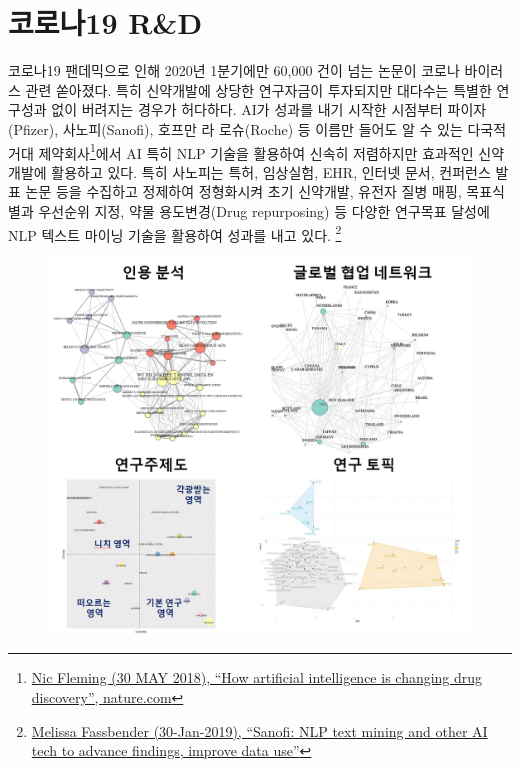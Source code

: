 \documentclass[smallextended]{svjour3}       %
\begin{document}
\hypertarget{covid-rnd}{%
\section{코로나19 R\&D}\label{covid-rnd}}

코로나19 팬데믹으로 인해 2020년 1분기에만 60,000 건이 넘는 논문이 코로나
바이러스 관련 쏟아졌다. 특히 신약개발에 상당한 연구자금이 투자되지만
대다수는 특별한 연구성과 없이 버려지는 경우가 허다하다. AI가 성과를 내기
시작한 시점부터 파이자(Pfizer), 사노피(Sanofi), 호프만 라 로슈(Roche) 등
이름만 들어도 알 수 있는 다국적 거대 제약회사\footnote{\href{https://www.nature.com/articles/d41586-018-05267-x}{Nic
  Fleming (30 MAY 2018), ``How artificial intelligence is changing drug
  discovery'', nature.com}}에서 AI 특히 NLP 기술을 활용하여 신속히
저렴하지만 효과적인 신약개발에 활용하고 있다. 특히 사노피는 특허,
임상실험, EHR, 인터넷 문서, 컨퍼런스 발표 논문 등을 수집하고 정제하여
정형화시켜 초기 신약개발, 유전자 질병 매핑, 목표식별과 우선순위 지정,
약물 용도변경(Drug repurposing) 등 다양한 연구목표 달성에 NLP 텍스트
마이닝 기술을 활용하여 성과를 내고 있다. \footnote{\href{https://www.outsourcing-pharma.com/Article/2019/01/30/Sanofi-NLP-text-mining-and-other-AI-tech-to-advance-findings-improve-data-use}{Melissa
  Fassbender (30-Jan-2019), ``Sanofi: NLP text mining and other AI tech
  to advance findings, improve data use''}}

\begin{figure}

{\centering \includegraphics[width=1\linewidth]{fig/nlp-rnd-showcase} 

}

\end{figure}




\end{document}
